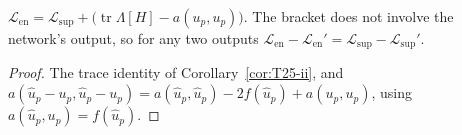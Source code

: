 \begin{theorem}[T26]\label{thm:T26}
  \leanok
  $\mathcal L_{\mathrm{en}}=\mathcal L_{\mathrm{sup}}
  +\bigl(\operatorname{tr}\Lambda[H]-a(u_p,u_p)\bigr)$.  The bracket does not
  involve the network's output, so for any two outputs
  $\mathcal L_{\mathrm{en}}-\mathcal L_{\mathrm{en}}'
  =\mathcal L_{\mathrm{sup}}-\mathcal L_{\mathrm{sup}}'$.
\end{theorem}

\begin{proof}
  \leanok
  The trace identity of Corollary~\ref{cor:T25-ii}, and
  $a(\hat u_p-u_p,\hat u_p-u_p)=a(\hat u_p,\hat u_p)-2f(\hat u_p)+a(u_p,u_p)$,
  using $a(\hat u_p,u_p)=f(\hat u_p)$.
\end{proof}
